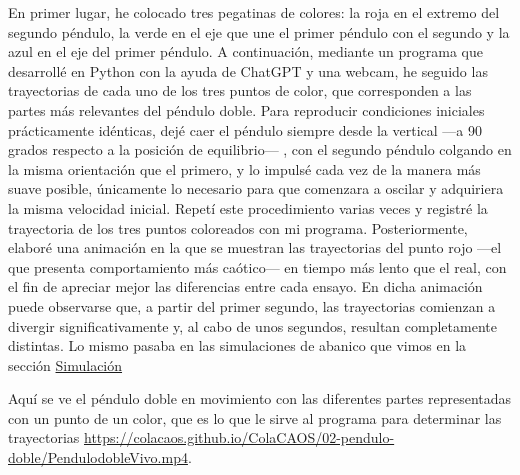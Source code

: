 \documentclass[
  10pt,
  a4paper,
  DIV=11,
  numbers=noendperiod,
  open=any]{scrreprt}
\numberwithin{equation}{chapter}
\numberwithin{equation}{section}
\renewcommand{\[}{\begin{equation}}
\renewcommand{\]}{\end{equation}}
\begin{document}
En primer lugar, he colocado tres pegatinas de colores: la roja en el extremo del
segundo péndulo, la verde en el eje que une el primer péndulo con el
segundo y la azul en el eje del primer péndulo. A continuación, mediante
un programa que desarrollé en Python con la ayuda de ChatGPT y una
webcam, he seguido las trayectorias de cada uno de los tres puntos de
color, que corresponden a las partes más relevantes del péndulo doble.
Para reproducir condiciones iniciales prácticamente idénticas, dejé caer
el péndulo siempre desde la vertical ---a 90 grados respecto a la
posición de equilibrio--- , con el segundo péndulo colgando en la misma
orientación que el primero, y lo impulsé cada vez de la manera más suave
posible, únicamente lo necesario para que comenzara a oscilar y
adquiriera la misma velocidad inicial. Repetí este procedimiento varias
veces y registré la trayectoria de los tres puntos coloreados con mi
programa. Posteriormente, elaboré una animación en la que se muestran
las trayectorias del punto rojo ---el que presenta comportamiento más
caótico--- en tiempo más lento que el real, con el fin de apreciar mejor
las diferencias entre cada ensayo. En dicha animación puede observarse
que, a partir del primer segundo, las trayectorias comienzan a divergir
significativamente y, al cabo de unos segundos, resultan completamente
distintas. Lo mismo pasaba en las simulaciones de abanico que vimos en
la sección \hyperref[sec-abanico]{Simulación}

Aquí se ve el péndulo doble en movimiento con las diferentes partes
representadas con un punto de un color, que es lo que le sirve al
programa para determinar las trayectorias \url{https://colacaos.github.io/ColaCAOS/02-pendulo-doble/PendulodobleVivo.mp4}.
\end{document}
